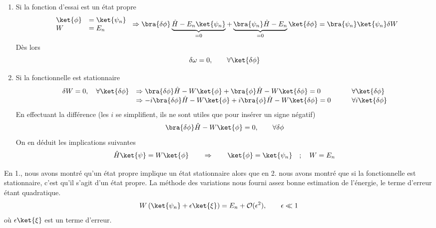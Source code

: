 	\begin{enumerate}
	\item Si la fonction d'essai est un état propre
	\begin{equation}
	\left.\begin{array}{ll}
	\ket{\phi}&=\ket{\psi_n}\\
	W &= E_n
	\end{array}\right.\Rightarrow \bra{\delta \phi}\underbrace{\hat{H}-E_n\ket{\psi_n}}_{=0}+
	\underbrace{\bra{\psi_n}\hat{H}-E_n}_{=0}\ket{\delta\phi}=\bra{\psi_n}\ket{\psi_n}\delta W
	\end{equation}
	Dès lors
	\begin{equation}
	\delta \omega = 0,\qquad \forall\ket{\delta\phi}
	\end{equation}
	\item Si la fonctionnelle est stationnaire
	\begin{equation}
	\begin{array}{lll}
	\delta W =0,\quad \forall \ket{\delta\phi} &\Rightarrow \bra{\delta \phi}\hat{H}-W\ket{\phi}+
	\bra{\phi}\hat{H}-W\ket{\delta \phi} =0&\qquad \forall\ket{\delta \phi}\\
	&\Rightarrow -i\bra{\delta \phi}\hat{H}-W\ket{\phi}+
	i\bra{\phi}\hat{H}-W\ket{\delta \phi} =0&\qquad \forall i\ket{\delta \phi}
	\end{array}
	\end{equation}
	En effectuant la différence (les $i$ se simplifient, ils ne sont utiles que pour insérer un 
	signe négatif)
	\begin{equation}
	\bra{\delta \phi}\hat{H}-W\ket{\phi} = 0, \qquad\forall \delta \phi
	\end{equation}
	On en déduit les implications suivantes
	\begin{equation}
	\hat{H}\ket{\psi} = W\ket{\phi}\qquad\Rightarrow\qquad \ket{\phi} = \ket{\psi_n}\quad;\quad 
	W=E_n
	\end{equation}
	\end{enumerate}	
	En 1., nous avons montré qu'un état propre implique un état stationnaire alors que en 2. 
	nous avons montré que si la fonctionnelle est stationnaire, c'est qu'il s'agit d'un 
	état propre. La méthode des variations nous fourni assez bonne estimation de l'énergie, 
	le terme d'erreur étant quadratique.
	\begin{equation}
	W\left(\ket{\psi_n}+\epsilon\ket{\xi}\right) = E_n+\mathcal{O}(\epsilon^2),\qquad \epsilon\ll1
	\end{equation}
	où $\epsilon\ket{\xi}$ est un terme d'erreur. \\
	
